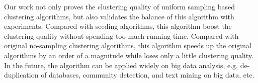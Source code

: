 \begin{englishabstract}
Our work not only proves the clustering quality of uniform sampling based clustering algorithms, but also validates the balance of this algorithm with experiments. Compared with seeding algorithms, this algorithm boost the clustering quality without spending too much running time. Compared with original no-sampling clustering algorithms, this algorithm speeds up the original algorithms by an order of a magnitude while loses only a little clustering quality. In the future, the algorithm can be applied widely on big data analysis, e.g. de-duplication of databases, community detection, and text mining on big data, etc.

\end{englishabstract}


